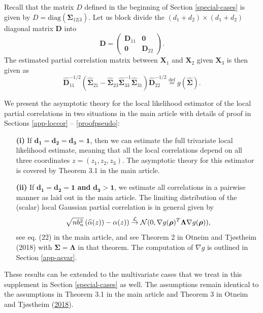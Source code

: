 \documentclass[
  12pt,
  letterpaper]{article}
\numberwithin{equation}{section}
\newcommand{\X}{\bm{X}}
\newcommand{\D}{\bm{D}}
\newcommand{\hD}{\widehat{\bm{D}}}
\newcommand{\frho}{\bm{\rho}}
\newcommand{\fSigma}{\bm{\Sigma}}
\newcommand{\hfSigma}{\widehat{\bm{\Sigma}}}
\newcommand{\fLambda}{\bm{\Lambda}}
\begin{document}
Recall that the matrix \(D\) defined in the beginning of Section \ref{special-cases} is given by \(D = \textrm{diag}(\fSigma_{12|3})\). Let us block divide the \((d_1+d_2)\times (d_1+d_2)\) diagonal matrix \(\D\) into
\[\D = \begin{pmatrix} \D_{11} & \bm{0} \\ \bm{0} & \D_{22}\end{pmatrix}.\]
The estimated partial correlation matrix between \(\X_1\) and \(\X_2\) given \(\X_3\) is then given as
\begin{equation}
\hD_{11}^{-1/2}\left(\hfSigma_{21} - \hfSigma_{23}\hfSigma_{33}^{-1}\hfSigma_{31}\right)\hD_{22}^{-1/2} \stackrel{\textrm{def}}{=} g(\hfSigma).
\label{eq:lgpc-matrix}
\end{equation}

We present the asymptotic theory for the local likelihood estimator of the local partial correlations in two situations in the main article with details of proof in Sections \ref{app-loccor} -- \ref{proofpseudo}:

\begin{itemize}
\item[\textbf{(i)}] If $\bm{d_1 = d_2 = d_3=1}$, then we can estimate the full trivariate local likelihood estimate, meaning that all the local correlations depend on all three coordinates $z=(z_1,z_2,z_3)$. The asymptotic theory for this estimator is covered by Theorem 3.1 in the main article.

\item[\textbf{(ii)}] If $\bm{d_1 = d_2 = 1}$ \textbf{and} $\bm{d_3 > 1}$, we estimate all correlations in a pairwise manner as laid out in the main article. The limiting distribution of the (scalar) local Gaussian partial correlation is in general given by 
\begin{equation}
\sqrt{nb_n^2}\left(\widehat{\alpha}(z))-\alpha(z)\right)  \stackrel {{\cal L}}{\to} {\cal N}(0,\nabla g(\frho)^{T} {\fLambda} \nabla g (\frho)),
\end{equation}
see eq. (22) in the main article, and see Theorem 2 in Otneim and Tjøstheim (2018) with $\fSigma = \fLambda$ in that theorem. The computation of $\nabla g$ is outlined in Section \ref{app-asvar}.
\end{itemize}

These results can be extended to the multivariate cases that we treat in this supplement in Section \ref{special-cases} as well. The assumptions remain identical to the assumptions in Theorem 3.1 in the main article and Theorem 3 in Otneim and Tjøstheim (\protect\hyperlink{ref-otneim2017conditional}{2018}).
\end{document}

